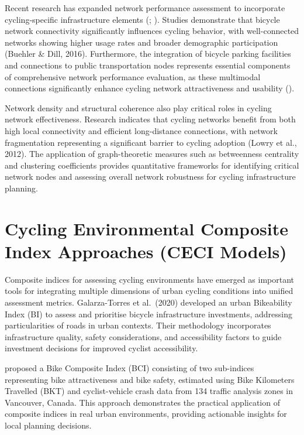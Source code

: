 \documentclass[
  12pt,
  oneside]{book}
\begin{document}
Recent research has expanded network performance assessment to incorporate cycling-specific infrastructure elements (\textcite{lovelace_propensity_2017}; \textcite{netjasov_potential_2019}). Studies demonstrate that bicycle network connectivity significantly influences cycling behavior, with well-connected networks showing higher usage rates and broader demographic participation (Buehler \& Dill, 2016). Furthermore, the integration of bicycle parking facilities and connections to public transportation nodes represents essential components of comprehensive network performance evaluation, as these multimodal connections significantly enhance cycling network attractiveness and usability (\textcite{geurs_multi-modal_2016}).

Network density and structural coherence also play critical roles in cycling network effectiveness. Research indicates that cycling networks benefit from both high local connectivity and efficient long-distance connections, with network fragmentation representing a significant barrier to cycling adoption (Lowry et al., 2012). The application of graph-theoretic measures such as betweenness centrality and clustering coefficients provides quantitative frameworks for identifying critical network nodes and assessing overall network robustness for cycling infrastructure planning.

\section{Cycling Environmental Composite Index Approaches (CECI Models)}\label{cycling-environmental-composite-index-approaches-ceci-models}

Composite indices for assessing cycling environments have emerged as important tools for integrating multiple dimensions of urban cycling conditions into unified assessment metrics. Galarza-Torres et al.~(2020) developed an urban Bikeability Index (BI) to assess and prioritise bicycle infrastructure investments, addressing particularities of roads in urban contexts. Their methodology incorporates infrastructure quality, safety considerations, and accessibility factors to guide investment decisions for improved cyclist accessibility.

\textcite{kamel_composite_2020} proposed a Bike Composite Index (BCI) consisting of two sub-indices representing bike attractiveness and bike safety, estimated using Bike Kilometers Travelled (BKT) and cyclist-vehicle crash data from 134 traffic analysis zones in Vancouver, Canada. This approach demonstrates the practical application of composite indices in real urban environments, providing actionable insights for local planning decisions.
\end{document}
